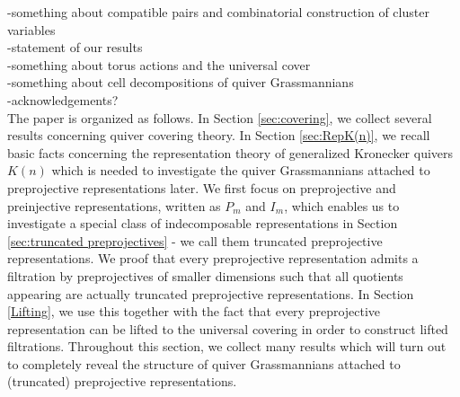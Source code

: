 \documentclass{amsart}
\numberwithin{equation}{section}
\begin{document}
-something about compatible pairs and combinatorial construction of cluster variables\\
-statement of our results\\
-something about torus actions and the universal cover\\
-something about cell decompositions of quiver Grassmannians\\
-acknowledgements?\\
The paper is organized as follows. In Section \ref{sec:covering}, we collect several results concerning quiver covering theory. In Section \ref{sec:RepK(n)}, we recall basic facts concerning the representation theory of generalized Kronecker quivers $K(n)$ which is needed to investigate the quiver Grassmannians attached to preprojective representations later. We first focus on preprojective and preinjective representations, written as $P_m$ and $I_m$, which enables us to investigate a special class of indecomposable representations in Section \ref{sec:truncated preprojectives} - we call them truncated preprojective representations. We proof that every preprojective representation admits a filtration by preprojectives of smaller dimensions such that all quotients appearing are actually truncated preprojective representations. In Section \ref{Lifting}, we use this together with the fact that every preprojective representation can be lifted to the universal covering in order to construct lifted filtrations. Throughout this section, we collect many results which will turn out to completely reveal the structure of quiver Grassmannians attached to (truncated) preprojective representations.
\end{document}
